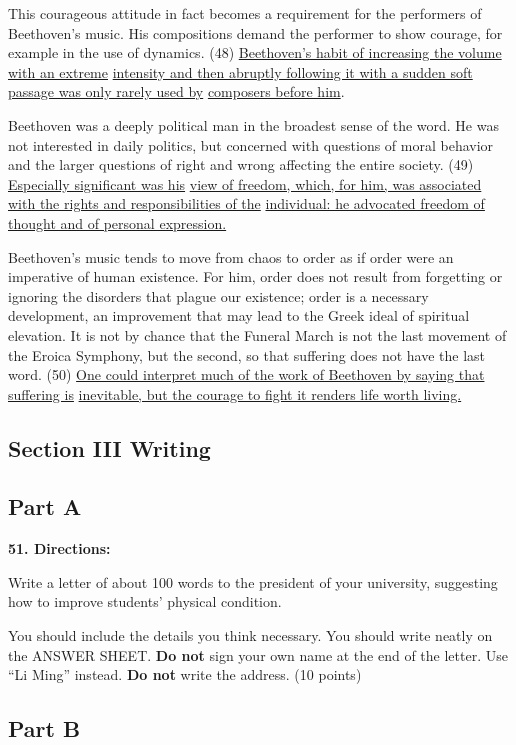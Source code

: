 \documentclass[UTF8,11pt]{ctexart}
\begin{document}
This courageous attitude in fact becomes a requirement for the performers of Beethoven’s music. His compositions demand the performer to show courage, for example in the use of dynamics. (48) \uline{Beethoven’s habit of increasing the volume with an extreme} \uline{intensity and then abruptly following it with a sudden soft passage was only rarely used by} \uline{composers before him}.


Beethoven was a deeply political man in the broadest sense of the word. He was not interested in daily politics, but concerned with questions of moral behavior and the larger questions of right and wrong affecting the entire society. (49) \uline{Especially significant was his} \uline{view of freedom, which, for him, was associated with the rights and responsibilities of the} \uline{individual: he advocated freedom of thought and of personal expression.}


Beethoven’s music tends to move from chaos to order as if order were an imperative of human existence. For him, order does not result from forgetting or ignoring the disorders that plague our existence; order is a necessary development, an improvement that may lead to the Greek ideal of spiritual elevation. It is not by chance that the Funeral March is not the last movement of the Eroica Symphony, but the second, so that suffering does not have the last word. (50) \uline{One could interpret much of the work of Beethoven by saying that suffering is} \uline{inevitable, but the courage to fight it renders life worth living.}


\subsection*{\textbf{Section III Writing}}


\subsection*{\textbf{Part A}}


\textbf{51. Directions:}


Write a letter of about 100 words to the president of your university, suggesting how to improve students’ physical condition.


You should include the details you think necessary. You should write neatly on the ANSWER SHEET. \textbf{Do not} sign your own name at the end of the letter. Use “Li Ming” instead. \textbf{Do not} write the address. (10 points)


\subsection*{\textbf{Part B}}
\end{document}
